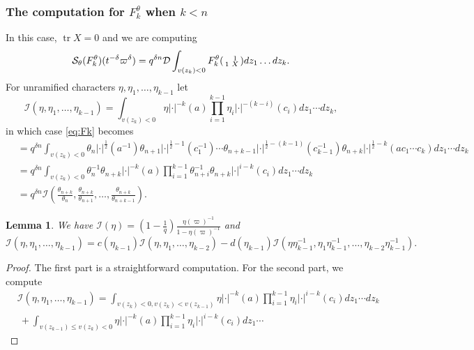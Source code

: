 \documentclass{amsart}
\newtheorem{lemma}[thm]{Lemma}
\theoremstyle{definition}
\newcommand{\tr}{\operatorname{tr}}
\newenvironment{spmatrix}{\left(\begin{smallmatrix}}{\end{smallmatrix}\right)}
\begin{document}
{\subsubsection{The computation for $F_k^\theta$ when $k<n$}\label{ss:shalikaFk}
In this case, $\tr X=0$ and we are computing
\begin{equation}\label{eq:Fk}\mathcal{S}_\theta(F^\theta_k)(t^{-\delta}\varpi^\delta )=q^{\delta n}\mathcal{D}\int_{v(z_k)<0} F^\theta_k \begin{spmatrix}&1\\1&X\end{spmatrix}dz_1\ldots dz_k.
\end{equation}
For unramified characters $\eta,\eta_1,\ldots, \eta_{k-1}$ let
\[\mathcal{I}(\eta,\eta_1,\ldots,\eta_{k-1})=\int_{v(z_k)<0}\eta|\cdot|^{-k}(a)\prod_{i=1}^{k-1}\eta_i|\cdot|^{-(k-i)}(c_i)dz_1\cdots dz_k,\]
in which case \eqref{eq:Fk} becomes
\begin{align*}&=q^{\delta n}\int_{v(z_k)<0}\theta_n|\cdot|^{\frac{1}{2}}(a^{-1})\theta_{n+1}|\cdot|^{\frac{1}{2}-1}(c_1^{-1})\cdots
    \theta_{n+k-1}|\cdot|^{\frac{1}{2}-(k-1)}(c_{k-1}^{-1})\theta_{n+k}|\cdot|^{\frac{1}{2}-k}(ac_1\cdots
    c_k)dz_1\cdots dz_k\\
  &=q^{\delta n}\int_{v(z_k)<0}\theta_n^{-1}\theta_{n+k}|\cdot|^{-k}(a)\prod_{i=1}^{k-1}\theta_{n+i}^{-1}\theta_{n+k}|\cdot|^{i-k}(c_i)dz_1\cdots
    dz_k\\
  &=q^{\delta n}\mathcal{I}(\frac{\theta_{n+k}}{\theta_n},\frac{\theta_{n+k}}{\theta_{n+1}},\ldots,\frac{\theta_{n+k}}{\theta_{n+k-1}}).
\end{align*}
\begin{lemma}\label{l:I}
We have $\displaystyle \mathcal{I}(\eta) =
\left(1-\frac{1}{q}\right)\frac{\eta(\varpi)^{-1}}{1-\eta(\varpi)^{-1}}$ and
\[\mathcal{I}(\eta,\eta_1,\ldots,\eta_{k-1})=c(\eta_{k-1})\mathcal{I}(\eta,\eta_1,\ldots,\eta_{k-2})-d(\eta_{k-1})\mathcal{I}(\eta\eta_{k-1}^{-1},\eta_1\eta_{k-1}^{-1},\ldots,\eta_{k-2}\eta_{k-1}^{-1}).\]
\end{lemma}
\begin{proof}
The first part is a straightforward computation. For the second part, we compute
\begin{align*}
&\mathcal{I}(\eta,\eta_1,\ldots,\eta_{k-1})=\int_{v(z_k)<0,v(z_k)<v(z_{k-1})}\eta|\cdot|^{-k}(a)\prod_{i=1}^{k-1}\eta_i|\cdot|^{i-k}(c_i)dz_1\cdots
                                            dz_k\\
  &\ +\int_{v(z_{k-1})\leqslant
                           v(z_k)<0}\eta|\cdot|^{-k}(a)\prod_{i=1}^{k-1}\eta_i|\cdot|^{i-k}(c_i)dz_1\cdots

\end{align*}
\end{proof}}
\end{document}
